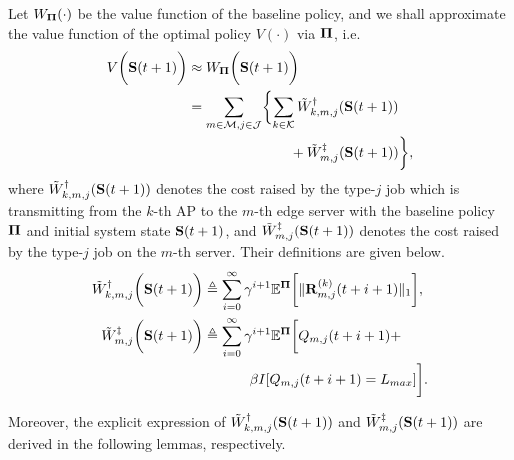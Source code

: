 Let $W_{\boldsymbol{\Pi}}(\cdot)$ be the value function of the baseline policy, and we shall approximate the value function of the optimal policy $V(\cdot)$ via $\boldsymbol{\Pi}$, i.e.
\begin{align}
    V\Paren{\Stat(t+1)} &\approx W_{\Baseline}\Paren{\Stat(t+1)}
    \nonumber\\
    &= \sum_{m\in\esSet,j\in\jSpace}\Brace{
        \sum_{k\in\apSet} \tilde{W}^{\AP}_{k,m,j}(\Stat(t+1))
        \nonumber\\
        &~~~~~~~~~~~~~~~~~~~~~~+\tilde{W}^{\ES}_{m,j}(\Stat(t+1))
    },
\end{align}
where $\tilde{W}^{\dagger}_{k,m,j}(\mathbf{S}(t+1))$ denotes the cost raised by the type-$j$ job which is transmitting from the $k$-th AP to the $m$-th edge server with the baseline policy $\boldsymbol{\Pi}$ and initial system state $\mathbf{S}(t+1)$, and $\tilde{W}^{\ddagger}_{m,j}(\mathbf{S}(t+1))$ denotes the cost raised by the type-$j$ job on the $m$-th server.
Their definitions are given below.
{\small
\begin{align}
    \tilde{W}^{\dagger}_{k,m,j} \bigg(\mathbf{S}(t+1)\bigg) &\triangleq
        \sum_{i=0}^{\infty} \gamma^{i+1} \mathbb{E}^{\boldsymbol{\Pi}}\bigg[
            \lVert\mathbf{R}^{(k)}_{m,j}(t+i+1)\|_1
        \bigg],
    \\    
    \tilde{W}^{\ddagger}_{m,j} \bigg(\mathbf{S}(t+1)\bigg) &\triangleq
        \sum_{i=0}^{\infty} \gamma^{i+1} \mathbb{E}^{\boldsymbol{\Pi}}\bigg[
            Q_{m,j}(t+i+1) +
            \nonumber\\
            &~~~~~~~~~~\beta I[Q_{m,j}(t+i+1) = L_{max}]
        \bigg].
\end{align}
}

Moreover, the explicit expression of $\tilde{W}^{\dagger}_{k,m,j}(\mathbf{S}(t+1))$ and $\tilde{W}^{\ddagger}_{m,j}(\mathbf{S}(t+1))$ are derived in the following lemmas, respectively.

